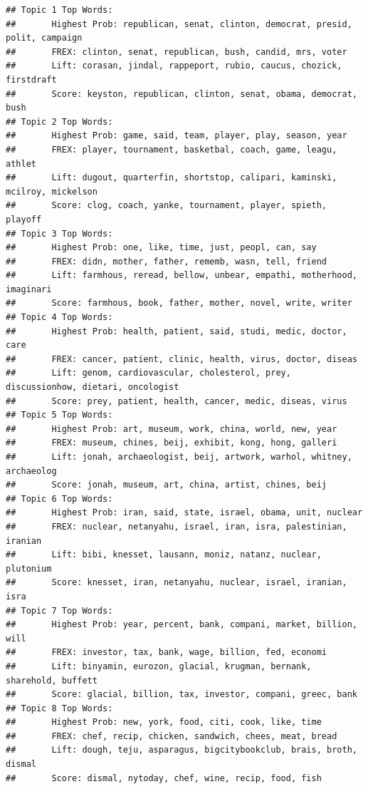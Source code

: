 \documentclass[12pt]{article}\usepackage[]{graphicx}\usepackage[]{color}
\makeatletter
\newenvironment{kframe}{%
 \def\at@end@of@kframe{}%
 \ifinner\ifhmode%
  \def\at@end@of@kframe{\end{minipage}}%
  \begin{minipage}{\columnwidth}%
 \fi\fi%
 \def\FrameCommand##1{\hskip\@totalleftmargin \hskip-\fboxsep
 \colorbox{shadecolor}{##1}\hskip-\fboxsep
     \hskip-\linewidth \hskip-\@totalleftmargin \hskip\columnwidth}%
 \MakeFramed {\advance\hsize-\width
   \@totalleftmargin\z@ \linewidth\hsize
   \@setminipage}}%
 {\par\unskip\endMakeFramed%
 \at@end@of@kframe}
\newenvironment{knitrout}{}{} %
\makeatother
\begin{document}
\begin{knitrout}
\color{fgcolor}\begin{kframe}
\begin{verbatim}
## Topic 1 Top Words:
##  	 Highest Prob: republican, senat, clinton, democrat, presid, polit, campaign 
##  	 FREX: clinton, senat, republican, bush, candid, mrs, voter 
##  	 Lift: corasan, jindal, rappeport, rubio, caucus, chozick, firstdraft 
##  	 Score: keyston, republican, clinton, senat, obama, democrat, bush 
## Topic 2 Top Words:
##  	 Highest Prob: game, said, team, player, play, season, year 
##  	 FREX: player, tournament, basketbal, coach, game, leagu, athlet 
##  	 Lift: dugout, quarterfin, shortstop, calipari, kaminski, mcilroy, mickelson 
##  	 Score: clog, coach, yanke, tournament, player, spieth, playoff 
## Topic 3 Top Words:
##  	 Highest Prob: one, like, time, just, peopl, can, say 
##  	 FREX: didn, mother, father, rememb, wasn, tell, friend 
##  	 Lift: farmhous, reread, bellow, unbear, empathi, motherhood, imaginari 
##  	 Score: farmhous, book, father, mother, novel, write, writer 
## Topic 4 Top Words:
##  	 Highest Prob: health, patient, said, studi, medic, doctor, care 
##  	 FREX: cancer, patient, clinic, health, virus, doctor, diseas 
##  	 Lift: genom, cardiovascular, cholesterol, prey, discussionhow, dietari, oncologist 
##  	 Score: prey, patient, health, cancer, medic, diseas, virus 
## Topic 5 Top Words:
##  	 Highest Prob: art, museum, work, china, world, new, year 
##  	 FREX: museum, chines, beij, exhibit, kong, hong, galleri 
##  	 Lift: jonah, archaeologist, beij, artwork, warhol, whitney, archaeolog 
##  	 Score: jonah, museum, art, china, artist, chines, beij 
## Topic 6 Top Words:
##  	 Highest Prob: iran, said, state, israel, obama, unit, nuclear 
##  	 FREX: nuclear, netanyahu, israel, iran, isra, palestinian, iranian 
##  	 Lift: bibi, knesset, lausann, moniz, natanz, nuclear, plutonium 
##  	 Score: knesset, iran, netanyahu, nuclear, israel, iranian, isra 
## Topic 7 Top Words:
##  	 Highest Prob: year, percent, bank, compani, market, billion, will 
##  	 FREX: investor, tax, bank, wage, billion, fed, economi 
##  	 Lift: binyamin, eurozon, glacial, krugman, bernank, sharehold, buffett 
##  	 Score: glacial, billion, tax, investor, compani, greec, bank 
## Topic 8 Top Words:
##  	 Highest Prob: new, york, food, citi, cook, like, time 
##  	 FREX: chef, recip, chicken, sandwich, chees, meat, bread 
##  	 Lift: dough, teju, asparagus, bigcitybookclub, brais, broth, dismal 
##  	 Score: dismal, nytoday, chef, wine, recip, food, fish 

\end{verbatim}
\end{kframe}
\end{knitrout}
\end{document}
